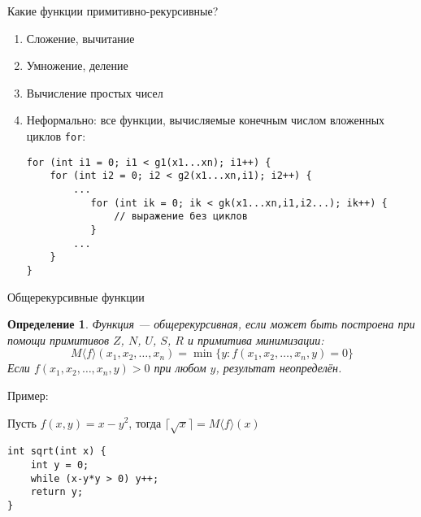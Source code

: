 \documentclass[aspectratio=169]{beamer}
\newtheorem{dfn}{Определение}[section]
\begin{document}
\begin{frame}[fragile]{Какие функции примитивно-рекурсивные?}
\begin{enumerate}
\item Сложение, вычитание\pause
\item Умножение, деление\pause
\item Вычисление простых чисел\pause
\item Неформально: все функции, вычисляемые конечным числом вложенных циклов \verb!for!:

\begin{verbatim}
for (int i1 = 0; i1 < g1(x1...xn); i1++) {
    for (int i2 = 0; i2 < g2(x1...xn,i1); i2++) {
        ...
           for (int ik = 0; ik < gk(x1...xn,i1,i2...); ik++) {
               // выражение без циклов
           }
        ...
    }
}
\end{verbatim}
\end{enumerate}
\end{frame}

\begin{frame}[fragile]{Общерекурсивные функции}
\begin{dfn}
Функция --- общерекурсивная, если может быть построена при помощи
примитивов $Z$, $N$, $U$, $S$, $R$ и примитива минимизации:
$$M\langle f \rangle (x_1,x_2,\dots,x_n) = \min\{y: f(x_1,x_2,\dots,x_n,y) = 0\}$$
Если $f(x_1,x_2,\dots,x_n,y) > 0$ при любом $y$, результат неопределён.
\end{dfn}\pause


Пример:

Пусть $f(x,y) = x-y^2$, тогда $\lceil\sqrt{x}\rceil = M\langle f\rangle (x)$

\begin{verbatim}
int sqrt(int x) {
    int y = 0;
    while (x-y*y > 0) y++;
    return y;
}
\end{verbatim}

\end{frame}
\end{document}
